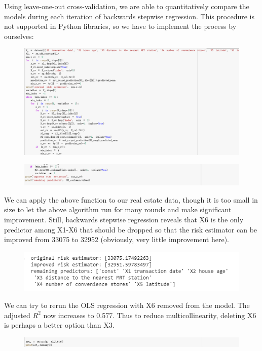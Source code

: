 \documentclass{article}
\begin{document}
Using leave-one-out cross-validation, we are able to quantitatively compare the models during each iteration of backwards stepwise regression. This procedure is not supported in Python libraries, so we have to implement the process by ourselves:
\begin{figure}[H]\centering\includegraphics[width=1.1\linewidth]{29.1}\end{figure}
\begin{figure}[H]\centering\includegraphics[width=1.1\linewidth]{29.2}\end{figure}
We can apply the above function to our real estate data, though it is too small in size to let the above algorithm run for many rounds and make significant improvement. Still, backwards stepwise regression reveals that X6 is the only predictor among X1-X6 that should be dropped so that the risk estimator can be improved from 33075 to 32952 (obviously, very little improvement here).
\begin{figure}[H]\includegraphics[width=0.8\linewidth]{30}\end{figure}
We can try to rerun the OLS regression with X6 removed from the model. The adjusted $R^2$ now increases to 0.577. Thus to reduce multicollinearity, deleting X6 is perhaps a better option than X3.
\begin{figure}[H]\includegraphics[width=1.1\linewidth]{31}\end{figure}
\end{document}
